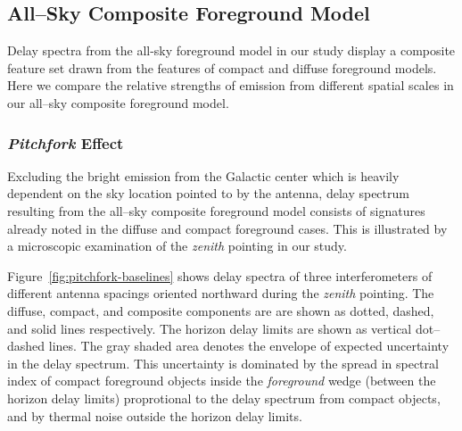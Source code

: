 \documentclass[preprint2,iop,numberedappendix]{emulateapj}
\begin{document}
\subsection{All--Sky Composite Foreground Model}\label{sec:composite}

Delay spectra from the all-sky foreground model in our study display a composite feature set drawn from the features of compact and diffuse foreground models. Here we compare the relative strengths of emission from different spatial scales in our all--sky composite foreground model. 

\subsubsection{{\it Pitchfork} Effect}\label{sec:pitchfork}

Excluding the bright emission from the Galactic center which is heavily dependent on the sky location pointed to by the antenna, delay spectrum resulting from the all--sky composite foreground model consists of signatures already noted in the diffuse and compact foreground cases. This is illustrated by a microscopic examination of the {\it zenith} pointing in our study. 

Figure~\ref{fig:pitchfork-baselines} shows delay spectra of three interferometers of different antenna spacings oriented northward during the {\it zenith} pointing. The diffuse, compact, and composite components are are shown as dotted, dashed, and solid lines respectively. The horizon delay limits are shown as vertical dot--dashed lines. The gray shaded area denotes the envelope of expected uncertainty in the delay spectrum. This uncertainty is dominated by the spread in spectral index of compact foreground objects inside the {\it foreground} wedge (between the horizon delay limits) proprotional to the delay spectrum from compact objects, and by thermal noise outside the horizon delay limits.
\end{document}
